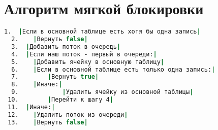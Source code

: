 \section{Алгоритм мягкой блокировки}

\begin{lstlisting}[language=csh,caption={Алгоритм Cassandra.TryGetLock(lockId, threadId)}]
  1.  |Если в основной таблице есть хотя бы одна запись|
  2.  	|Вернуть false|
  3.  |Добавить поток в очередь|
  4.  |Если наш поток - первый в очереди:|
  5.  	|Добавить ячейку в основную таблицу|
  6.  	|Если в основной таблице есть только одна запись:|
  7.  		|Вернуть true|
  8.  	|Иначе:|
  9.  			|Удалить ячейку из основной таблицы|
 10.  		|Перейти к шагу 4|
 11.  |Иначе:|
 12.  	|Удалить поток из очереди|
 13.  	|Вернуть false|
\end{lstlisting}